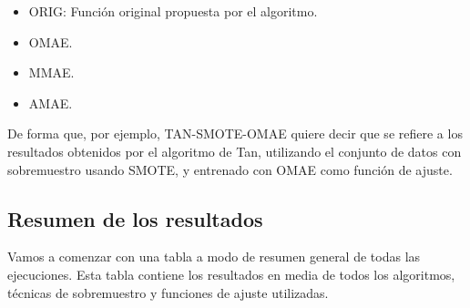 \begin{itemize}
	\item ORIG: Función original propuesta por el algoritmo.
	\item OMAE.
	\item MMAE.
	\item AMAE.
\end{itemize}

De forma que, por ejemplo, TAN-SMOTE-OMAE quiere decir que se refiere a los resultados obtenidos por el algoritmo de Tan, utilizando el conjunto de datos con sobremuestro usando SMOTE, y entrenado con OMAE como función de ajuste.

\subsection{Resumen de los resultados}

Vamos a comenzar con una tabla a modo de resumen general de todas las ejecuciones. Esta tabla contiene los resultados en media de todos los algoritmos, técnicas de sobremuestro y funciones de ajuste utilizadas.

